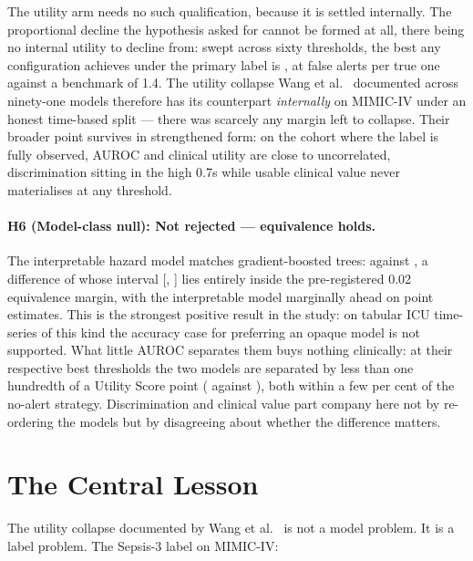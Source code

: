 The utility arm needs no such qualification, because it is settled internally.
The proportional decline the hypothesis asked for cannot be formed at all,
there being no internal utility to decline from: swept across sixty thresholds,
the best any configuration achieves under the primary label is
\pcUtilityMaxGbtB{}, at \pcUtilityOptBurdenGbtB{} false alerts per true one
against a benchmark of 1.4. The utility collapse Wang et al.\
\cite{wang2025srpm} documented across ninety-one models therefore has its
counterpart \emph{internally} on MIMIC-IV under an honest time-based split ---
there was scarcely any margin left to collapse. Their broader point survives in
strengthened form: on the cohort where the label is fully observed, AUROC and
clinical utility are close to uncorrelated, discrimination sitting in the high
0.7s while usable clinical value never materialises at any threshold.

\paragraph{H6 (Model-class null): Not rejected --- equivalence holds.}
The interpretable hazard model matches gradient-boosted trees:
\pcAurocPrimaryB{} against \pcAurocGbtB, a difference of \pcHSixEst{} whose
interval [\pcHSixCiLo, \pcHSixCiHi] lies entirely inside the pre-registered
0.02 equivalence margin, with the interpretable model marginally ahead on point
estimates. This is the strongest positive result in the study: on tabular ICU
time-series of this kind the accuracy case for preferring an opaque model is
not supported. What little AUROC separates them buys nothing clinically: at their
respective
best thresholds the two models are separated by less than one hundredth of a
Utility Score point (\pcUtilityMaxGbtB{} against \pcUtilityMaxPrimaryB{}), both
within a few per cent of the no-alert strategy. Discrimination and clinical
value part company here not by re-ordering the models but by disagreeing about
whether the difference matters.


\section{The Central Lesson}

The utility collapse documented by Wang et al.\ \cite{wang2025srpm} is
not a model problem. It is a label problem. The Sepsis-3 label on MIMIC-IV:

